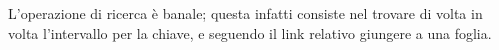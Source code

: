 \documentclass{subfiles}
\begin{document}
L'operazione di ricerca è banale; questa infatti consiste nel trovare di volta in volta l'intervallo per la chiave,
e seguendo il link relativo giungere a una foglia.
\end{document}
